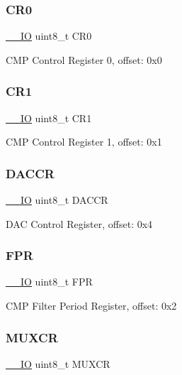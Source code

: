 \subsubsection{\texorpdfstring{CR0}{CR0}}
{\footnotesize\ttfamily \mbox{\hyperlink{core__cm0plus_8h_aec43007d9998a0a0e01faede4133d6be}{\+\_\+\+\_\+\+IO}} uint8\+\_\+t C\+R0}

C\+MP Control Register 0, offset\+: 0x0 \mbox{\label{struct_c_m_p___type_abdb5e2aed90a3a46151c8bb740665579}} 
\subsubsection{\texorpdfstring{CR1}{CR1}}
{\footnotesize\ttfamily \mbox{\hyperlink{core__cm0plus_8h_aec43007d9998a0a0e01faede4133d6be}{\+\_\+\+\_\+\+IO}} uint8\+\_\+t C\+R1}

C\+MP Control Register 1, offset\+: 0x1 \mbox{\label{struct_c_m_p___type_a67ee6ed882d48b23ff9b82a947a1e2ea}} 
\subsubsection{\texorpdfstring{DACCR}{DACCR}}
{\footnotesize\ttfamily \mbox{\hyperlink{core__cm0plus_8h_aec43007d9998a0a0e01faede4133d6be}{\+\_\+\+\_\+\+IO}} uint8\+\_\+t D\+A\+C\+CR}

D\+AC Control Register, offset\+: 0x4 \mbox{\label{struct_c_m_p___type_a366faa2333304f3085d824a6b21d6f43}} 
\subsubsection{\texorpdfstring{FPR}{FPR}}
{\footnotesize\ttfamily \mbox{\hyperlink{core__cm0plus_8h_aec43007d9998a0a0e01faede4133d6be}{\+\_\+\+\_\+\+IO}} uint8\+\_\+t F\+PR}

C\+MP Filter Period Register, offset\+: 0x2 \mbox{\label{struct_c_m_p___type_aaa661e87917570b0139052849a7a1dae}} 
\subsubsection{\texorpdfstring{MUXCR}{MUXCR}}
{\footnotesize\ttfamily \mbox{\hyperlink{core__cm0plus_8h_aec43007d9998a0a0e01faede4133d6be}{\+\_\+\+\_\+\+IO}} uint8\+\_\+t M\+U\+X\+CR}

